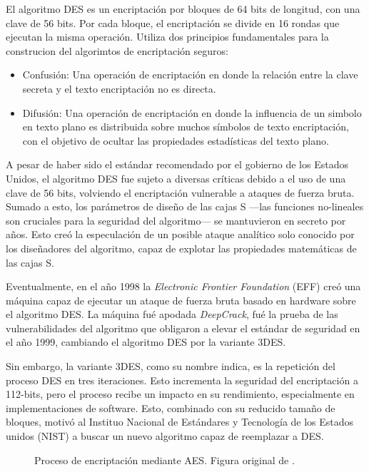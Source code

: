 El algoritmo DES es un encriptación por bloques de 64 bits de longitud, con una clave de 56 bits. Por cada bloque, el encriptación se divide en 16 rondas que ejecutan la misma operación. Utiliza dos principios fundamentales para la construcion del algorimtos de encriptación seguros:
\begin{itemize}
    \item Confusión: Una operación de encriptación en donde la relación entre la clave secreta y el texto encriptación no es directa.
    \item Difusión: Una operación de encriptación en donde la influencia de un simbolo en texto plano es distribuida sobre muchos símbolos de texto encriptación, con el objetivo de ocultar las propiedades estadísticas del texto plano.
\end{itemize}
A pesar de haber sido el estándar recomendado por el gobierno de los Estados Unidos, el algoritmo DES fue sujeto a diversas críticas debido a el uso de una clave de 56 bits, volviendo el encriptación vulnerable a ataques de fuerza bruta. Sumado a esto, los parámetros de diseño de las cajas S —las funciones no-lineales son cruciales para la seguridad del algoritmo— se mantuvieron en secreto por años. Esto creó la especulación de un posible ataque analítico solo conocido por los diseñadores del algoritmo, capaz de explotar las propiedades matemáticas de las cajas S.

Eventualmente, en el año 1998 la \textit{Electronic Frontier Foundation} (EFF) creó una máquina capaz de ejecutar un ataque de fuerza bruta basado en hardware sobre el algoritmo DES. La máquina fué apodada \textit{DeepCrack}, fué la prueba de las vulnerabilidades del algoritmo que obligaron a elevar el estándar de seguridad en el año 1999, cambiando el algoritmo DES por la variante 3DES.

Sin embargo, la variante 3DES, como su nombre indica, es la repetición del proceso DES en tres iteraciones. Esto incrementa la seguridad del encriptación a 112-bits, pero el proceso recibe un impacto en su rendimiento, especialmente en implementaciones de software.  Esto, combinado con su reducido tamaño de bloques, motivó al Instituo Nacional de Estándares y Tecnología de los Estados unidos (NIST) a buscar un nuevo algoritmo capaz de reemplazar a DES. 

\begin{figure}
    \centering
    \noindent
    \caption{Proceso de encriptación mediante AES. Figura original de \cite{paar-2011}. }
    \label{fig:AES_example}
\end{figure}

